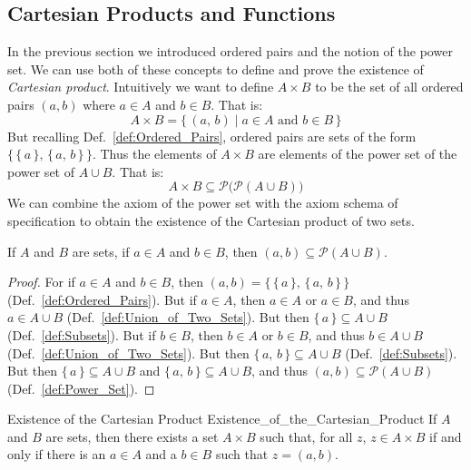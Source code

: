    \subsection{Cartesian Products and Functions}
        In the previous section we introduced ordered pairs and the notion of
        the power set. We can use both of these concepts to define and prove
        the existence of \textit{Cartesian product}. Intuitively we want to
        define $A\times{B}$ to be the set of all ordered pairs $(a,b)$ where
        $a\in{A}$ and $b\in{B}$. That is:
        \begin{equation}
            A\times{B}
            =\{\,(a,\,b)\;|\;a\in{A}\textrm{ and }b\in{B}\,\}
        \end{equation}
        But recalling Def.~\ref{def:Ordered_Pairs}, ordered pairs are sets
        of the form $\{\,\{\,a\,\},\,\{\,a,\,b\,\}\,\}$. Thus the elements of
        $A\times{B}$ are elements of the power set of the power set of
        $A\cup{B}$. That is:
        \begin{equation}
            A\times{B}\subseteq\mathcal{P}\big(\mathcal{P}(A\cup{B})\big)
        \end{equation}
        We can combine the axiom of the power set with the axiom schema of
        specification to obtain the existence of the Cartesian product of
        two sets.
        \begin{theorem}
            \label{thm:Ordered_Pair_Subset_of_Power_Set}%
            If $A$ and $B$ are sets, if $a\in{A}$ and $b\in{B}$, then
            $(a,b)\subseteq\mathcal{P}(A\cup{B})$.
        \end{theorem}
        \begin{proof}
            For if $a\in{A}$ and $b\in{B}$, then
            $(a,b)=\{\,\{\,a\,\},\,\{\,a,\,b\,\}\,\}$
            (Def.~\ref{def:Ordered_Pairs}). But if $a\in{A}$, then $a\in{A}$
            or $a\in{B}$, and thus $a\in{A}\cup{B}$
            (Def.~\ref{def:Union_of_Two_Sets}). But then
            $\{\,a\,\}\subseteq{A}\cup{B}$ (Def.~\ref{def:Subsets}). But if
            $b\in{B}$, then $b\in{A}$ or $b\in{B}$, and thus $b\in{A}\cup{B}$
            (Def.~\ref{def:Union_of_Two_Sets}). But then
            $\{\,a,\,b\,\}\subseteq{A}\cup{B}$ (Def.~\ref{def:Subsets}).
            But then $\{\,a\,\}\subseteq{A}\cup{B}$ and
            $\{\,a,\,b\,\}\subseteq{A}\cup{B}$, and thus
            $(a,b)\subseteq\mathcal{P}(A\cup{B})$ (Def.~\ref{def:Power_Set}).
        \end{proof}
        \begin{ltheorem}{Existence of the Cartesian Product}
                        {Existence_of_the_Cartesian_Product}
            If $A$ and $B$ are sets, then there exists a set $A\times{B}$
            such that, for all $z$, $z\in{A}\times{B}$ if and only if there
            is an $a\in{A}$ and a $b\in{B}$ such that $z=(a,b)$.
        \end{ltheorem}
